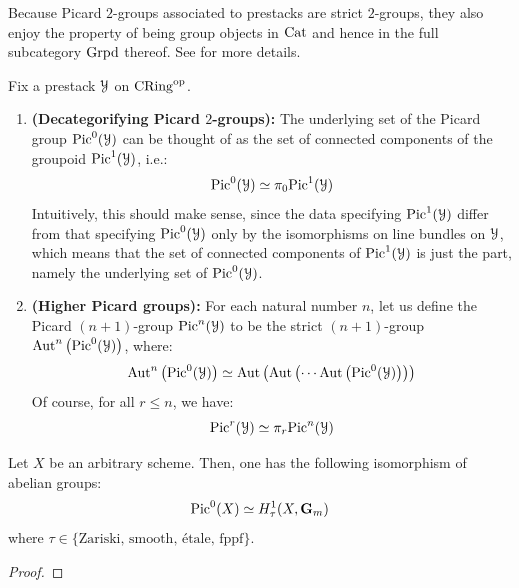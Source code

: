                 \begin{remark} \label{remark: picard_2_groups_are_groups_in_Cat}
                    Because Picard $2$-groups associated to prestacks are strict $2$-groups, they also enjoy the property of being group objects in $\mathrm{Cat}$ and hence in the full subcategory $\mathrm{Grpd}$ thereof. See \cite{nlab:strict_2-group} for more details.
                \end{remark}
                \begin{remark}
                    Fix a prestack $\mathcal{Y}$ on $\mathrm{CRing}^{\mathrm{op}}$.
                    \begin{enumerate}
                        \item \textbf{(Decategorifying Picard $2$-groups):} The underlying set of the Picard group $\mathrm{Pic}^0(\mathcal{Y})$ can be thought of as the set of connected components of the groupoid $\mathrm{Pic}^1(\mathcal{Y})$, i.e.:
                            $$\mathrm{Pic}^0(\mathcal{Y}) \simeq \pi_0\mathrm{Pic}^1(\mathcal{Y})$$
                        Intuitively, this should make sense, since the data specifying $\mathrm{Pic}^1(\mathcal{Y})$ differ from that specifying $\mathrm{Pic}^0(\mathcal{Y})$ only by the  isomorphisms on line bundles on $\mathcal{Y}$, which means that the set of connected components of $\mathrm{Pic}^1(\mathcal{Y})$ is just the  part, namely the underlying set of $\mathrm{Pic}^0(\mathcal{Y})$. 
                        \item \textbf{(Higher Picard groups):} For each natural number $n$, let us define the Picard $(n + 1)$-group $\mathrm{Pic}^n(\mathcal{Y})$ to be the strict $(n + 1)$-group $\mathrm{Aut}^n\left(\mathrm{Pic}^0(\mathcal{Y})\right)$, where:
                            $$\mathrm{Aut}^n\left(\mathrm{Pic}^0(\mathcal{Y})\right) \simeq \mathrm{Aut}\left( \mathrm{Aut}\left( \cdots \mathrm{Aut}\left(\mathrm{Pic}^0(\mathcal{Y})\right) \right) \right)$$
                        Of course, for all $r \leq n$, we have:
                            $$\mathrm{Pic}^r(\mathcal{Y}) \simeq \pi_r\mathrm{Pic}^n(\mathcal{Y})$$
                    \end{enumerate}
                \end{remark}
                
                \begin{theorem} \label{theorem: hilbert_90}
                    Let $X$ be an arbitrary scheme. Then, one has the following isomorphism of abelian groups:
                        $$\mathrm{Pic}^0(X) \simeq H^1_{\tau}(X, \mathbf{G}_m)$$
                    where $\tau \in \{\text{Zariski, smooth, \'etale, fppf}\}$.
                \end{theorem}
                    \begin{proof}
                        
                    \end{proof}
                
